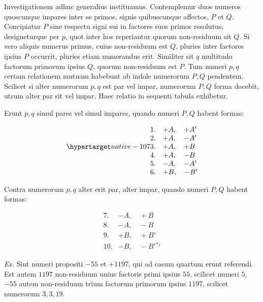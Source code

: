 
Investigationem adhuc generalius instituamus. Contemplemur duos numeros quoscunque impares inter se primos, signis quibuscunque affectos, $P$ et $Q$. Concipiatur $P$ sine respectu signi sui in factores suos primos resolutus, designeturque per $p$, quot inter hos reperiantur quorum non-residuum sit $Q$. Si vero aliquis numerus primus, cuius non-residuum est $Q$, pluries inter factores ipsius $P$ occurrit, pluries etiam numerandus erit. Similiter sit $q$ multitudo factorum primorum ipsius $Q$, quorum non-residuum est $P$. Tum numeri $p,q$ certam relationem mutuam habebunt ab indole numerorum $P,Q$ pendentem. Scilicet si alter numerorum $p,q$ est par vel impar, numerorum $P,Q$ forma docebit, utrum alter par sit vel impar. Haec relatio in sequenti tabula exhibetur.

Erunt $p,q$ simul pares vel simul impares, quando numeri $P,Q$ habent formas:

\[
\begin{array}{rl}1.&+A,\quad+A'\\2.&+A,\quad-A'\\\SourceLeaf{107}3.&+A,\quad+B\\4.&+A,\quad-B\\5.&-A,\quad-A'\\6.&+B,\quad-B'\end{array}
\]

Contra numerorum $p,q$ alter erit par, alter impar, quando numeri $P,Q$ habent formas:

\[
\begin{array}{rl}7.&-A,\quad+B\\8.&-A,\quad-B\\9.&+B,\quad+B'\\10.&-B,\quad-B'{}^{*)}\end{array}
\]


\emph{Ex.} Sint numeri propositi $-55$ et $+1197$, qui ad casum quartum erunt referendi. Est autem $1197$ non-residuum unius factoris primi ipsius $55$. scilicet numeri $5$, $-55$ autem non-residuum trium factorum primorum ipsius $1197$, scilicet numerorum $3,3,19$.

